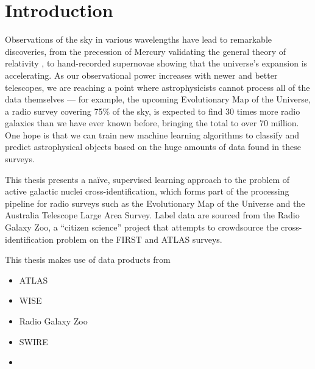 
\chapter{Introduction}
\label{cha:intro}

Observations of the sky in various wavelengths have lead to remarkable discoveries, from the precession of Mercury validating the general theory of relativity , to hand-recorded supernovae showing that the universe's expansion is accelerating. As our observational power increases with newer and better telescopes, we are reaching a point where astrophysicists cannot process all of the data themselves --- for example, the upcoming Evolutionary Map of the Universe, a radio survey covering 75\% of the sky, is expected to find 30 times more radio galaxies than we have ever known before, bringing the total to over 70 million. One hope is that we can train new machine learning algorithms to classify and predict astrophysical objects based on the huge amounts of data found in these surveys.

This thesis presents a naïve, supervised learning approach to the problem of active galactic nuclei cross-identification, which forms part of the processing pipeline for radio surveys such as the Evolutionary Map of the Universe and the Australia Telescope Large Area Survey. Label data are sourced from the Radio Galaxy Zoo, a ``citizen science'' project that attempts to crowdsource the cross-identification problem on the FIRST and ATLAS surveys.


This thesis makes use of data products from
\begin{itemize}
    \item ATLAS
    \item WISE
    \item Radio Galaxy Zoo
    \item SWIRE
    \item 
\end{itemize}